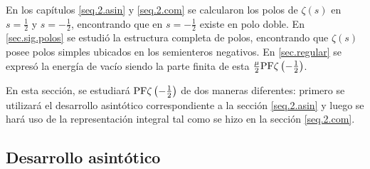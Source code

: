 En los capítulos \ref{seq.2.asin} y \ref{seq.2.com} se calcularon los polos de \mbox{$\zeta (s)$} en $s= \frac{1}{2}$ y $s=-\frac{1}{2}$, encontrando que en $s=- \frac{1}{2}$ existe en polo doble. En \ref{sec.sig.polos} se estudió la estructura completa de polos, encontrando que $\zeta (s)$ posee polos simples ubicados en los semienteros negativos. En \ref{sec.regular} se expresó la energía de vacío siendo la parte finita de esta $\frac{\mu}{2} {\rm PF } \zeta \left( - \frac{1}{2} \right)$.

En esta sección, se estudiará ${\rm PF } \zeta \left( - \frac{1}{2} \right)$ de dos maneras diferentes: primero se utilizará el desarrollo asintótico correspondiente a la sección \ref{seq.2.asin} y luego se hará uso de la representación integral tal como se hizo en la sección \ref{seq.2.com}.

\subsection{Desarrollo asintótico}\label{seq.desarrollo.asintotico}

